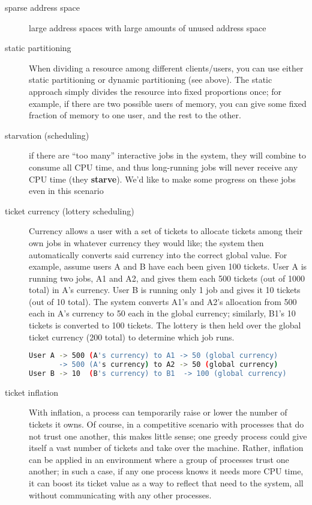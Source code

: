\begin{description}
\item[sparse address space] large address spaces with large amounts of unused address space

\item[static partitioning] When dividing a resource among different clients/users, you can use either static partitioning or dynamic partitioning (see above). The static approach simply divides the resource into fixed proportions once; for example, if there are two possible users of memory, you can give some fixed fraction of memory to one user, and the rest to the other.

\item[starvation (scheduling)]  if there are ``too many'' interactive jobs in the system, they will combine to consume all CPU time, and thus long-running jobs will never receive any CPU time (they \textbf{starve}). We'd like to make some progress on these jobs even in this scenario


\item[ticket currency (lottery scheduling)] Currency allows a user with a set of tickets to allocate tickets among their own jobs in whatever currency they
would like; the system then automatically converts said currency into the
correct global value. For example, assume users A and B have each been given 100 tickets. User A is running two jobs, A1 and A2, and gives them each 500 tickets (out of 1000 total) in A's currency. User B is running only 1 job and gives it 10 tickets (out of 10 total). The system converts A1's and A2's allocation from 500 each in A's currency to 50 each in the global currency; similarly, B1's 10 tickets is converted to 100 tickets. The lottery is then held over the global ticket currency (200 total) to determine which job runs.
\begin{lstlisting}[language=bash]
User A -> 500 (A's currency) to A1 -> 50 (global currency)
       -> 500 (A's currency) to A2 -> 50 (global currency)
User B -> 10  (B's currency) to B1  -> 100 (global currency)
\end{lstlisting}

\item[ticket inflation] With inflation, a process can temporarily raise or lower the number of tickets it owns. Of course, in a competitive scenario with processes that do not trust one another, this makes little sense; one greedy process could give itself a vast number of tickets and take over the machine. Rather, inflation can be applied in an environment where a group of processes trust one another; in such a case, if any one process knows it needs more CPU time, it can boost its ticket value as a way to reflect that need to the system, all without communicating with any other processes.


\end{description}
